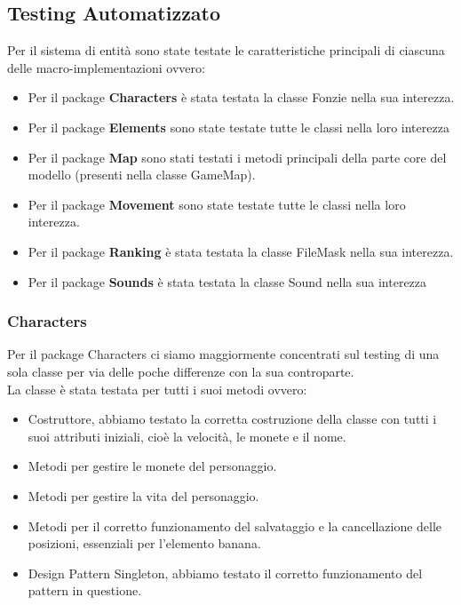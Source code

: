 \documentclass[12pt, letterpaper]{article}
\begin{document}
    \subsection{Testing Automatizzato}
        Per il sistema di entità sono state testate le caratteristiche principali di
        ciascuna delle macro-implementazioni ovvero:
            \begin{itemize}
                \item Per il package \textbf{Characters} è stata testata la classe Fonzie nella sua interezza.
                \item  Per il package \textbf{Elements} sono state testate tutte le classi nella loro interezza
                \item Per il package \textbf{Map} sono stati testati i metodi principali della parte core del modello (presenti nella classe GameMap).
                \item Per il package \textbf{Movement} sono state testate tutte le classi nella loro interezza.
                \item Per il package \textbf{Ranking} è stata testata la classe FileMask nella sua interezza.
                \item Per il package \textbf{Sounds} è stata testata la classe Sound nella sua interezza
            \end{itemize}
        \subsubsection{Characters}
            Per il package Characters ci siamo maggiormente concentrati sul testing di una sola classe per via delle poche differenze con la sua controparte.\\
            La classe è stata testata per tutti i suoi metodi ovvero:
                \begin{itemize}
                    \item Costruttore, abbiamo testato la corretta costruzione della classe con tutti i suoi attributi iniziali, cioè la velocità, le monete e il nome.
                    \item Metodi per gestire le monete del personaggio.
                    \item Metodi per gestire la vita del personaggio.
                    \item Metodi per il corretto funzionamento del salvataggio e la cancellazione delle posizioni, essenziali per l'elemento banana.
                    \item Design Pattern Singleton, abbiamo testato il corretto funzionamento del pattern in questione.
                \end{itemize}
\end{document}
